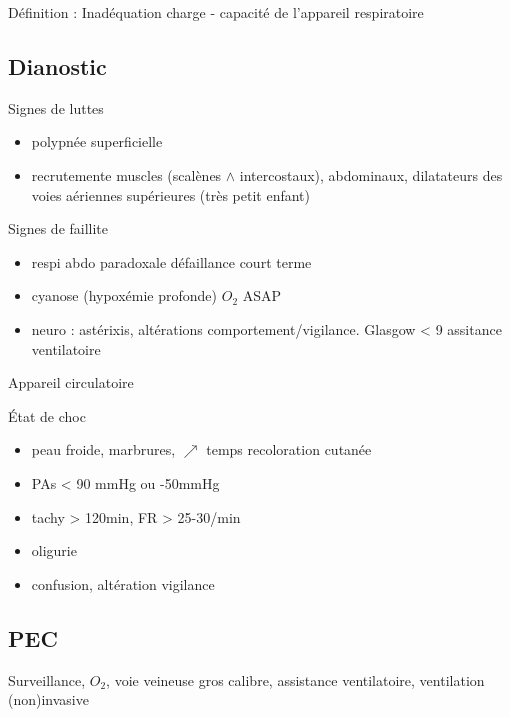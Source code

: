 \documentclass{book}
\begin{document}
Définition : Inadéquation charge - capacité de l'appareil respiratoire

\subsection{Dianostic}
\label{sec:orge2dd99b}
Signes de luttes

\begin{itemize}
\item polypnée superficielle
\item recrutemente muscles (scalènes \(\wedge\) intercostaux), abdominaux,
dilatateurs des voies aériennes supérieures (très petit enfant)
\end{itemize}

Signes de faillite

\begin{itemize}
\item respi abdo paradoxale \faBomb{} défaillance court terme
\item cyanose (hypoxémie profonde) \thus \(O_2\) ASAP
\item neuro : astérixis, altérations comportement/vigilance. Glasgow < 9
\thus assitance ventilatoire
\end{itemize}

Appareil circulatoire


État de choc 

\begin{itemize}
\item peau froide, marbrures, \(\nearrow\) temps recoloration cutanée
\item PAs < 90 mmHg ou -50mmHg
\item tachy > 120min, FR > 25-30/min
\item oligurie
\item confusion, altération vigilance
\end{itemize}


\subsection{PEC}
\label{sec:org10bec17}
Surveillance, \(O_2\), voie veineuse gros calibre, assistance ventilatoire,
ventilation (non)invasive
\end{document}
